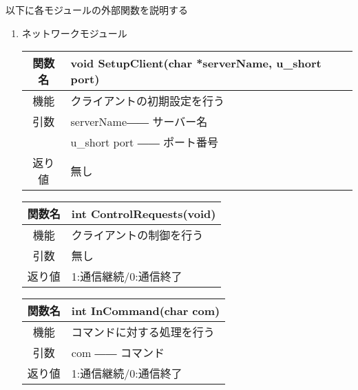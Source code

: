 \documentclass{jarticle}
\begin{document}
以下に各モジュールの外部関数を説明する
\begin{enumerate}
    \item ネットワークモジュール
    \begin{table}[H]
        \label{table:fanc_c1-1}
        \begin{center}
            \begin{tabular}{|c||p{30em}|}\hline
                関数名&void SetupClient(char *serverName, u\_short port) \\\hline
                機能&クライアントの初期設定を行う\\
                引数&serverName―― サーバー名\\
                &u\_short port ―― ポート番号\\
                返り値&無し\\\hline
            \end{tabular}
        \end{center}
    \end{table}
    \begin{table}[H]
        \label{table:fanc_c1-2}
        \begin{center}
            \begin{tabular}{|c||p{30em}|}\hline
                関数名&int ControlRequests(void) \\\hline
                機能&クライアントの制御を行う\\
                引数&無し\\
                返り値&1:通信継続/0:通信終了\\\hline
            \end{tabular}
        \end{center}
    \end{table}
    \begin{table}[H]
        \label{table:fanc_c1-3}
        \begin{center}
            \begin{tabular}{|c||p{30em}|}\hline
                関数名&int InCommand(char com) \\\hline
                機能&コマンドに対する処理を行う\\
                引数&com ―― コマンド\\
                返り値&1:通信継続/0:通信終了\\\hline
            \end{tabular}
        \end{center}
    \end{table}

\end{enumerate}
\end{document}
